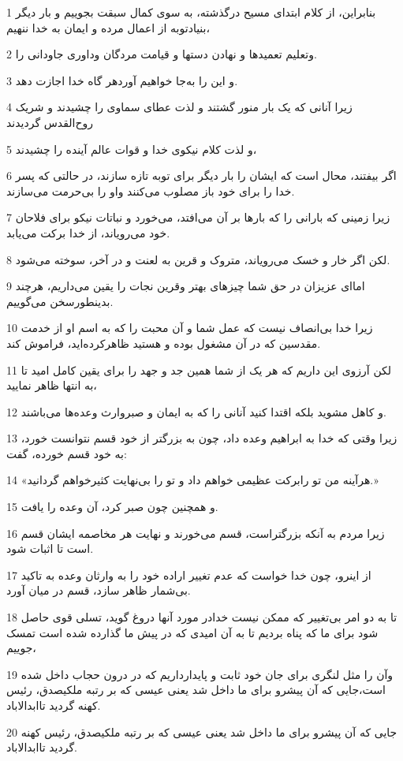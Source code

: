 \par 1 بنابراین، از کلام ابتدای مسیح درگذشته، به سوی کمال سبقت بجوییم و بار دیگر بنیادتوبه از اعمال مرده و ایمان به خدا ننهیم،
\par 2 وتعلیم تعمیدها و نهادن دستها و قیامت مردگان وداوری جاودانی را.
\par 3 و این را به‌جا خواهیم آوردهر گاه خدا اجازت دهد.
\par 4 زیرا آنانی که یک بار منور گشتند و لذت عطای سماوی را چشیدند و شریک روح‌القدس گردیدند
\par 5 و لذت کلام نیکوی خدا و قوات عالم آینده را چشیدند،
\par 6 اگر بیفتند، محال است که ایشان را بار دیگر برای توبه تازه سازند، در حالتی که پسر خدا را برای خود باز مصلوب می‌کنند واو را بی‌حرمت می‌سازند.
\par 7 زیرا زمینی که بارانی را که بارها بر آن می‌افتد، می‌خورد و نباتات نیکو برای فلاحان خود می‌رویاند، از خدا برکت می‌یابد.
\par 8 لکن اگر خار و خسک می‌رویاند، متروک و قرین به لعنت و در آخر، سوخته می‌شود.
\par 9 اما‌ای عزیزان در حق شما چیزهای بهتر وقرین نجات را یقین می‌داریم، هر‌چند بدینطورسخن می‌گوییم.
\par 10 زیرا خدا بی‌انصاف نیست که عمل شما و آن محبت را که به اسم او از خدمت مقدسین که در آن مشغول بوده و هستید ظاهرکرده‌اید، فراموش کند.
\par 11 لکن آرزوی این داریم که هر یک از شما همین جد و جهد را برای یقین کامل امید تا به انتها ظاهر نمایید،
\par 12 و کاهل مشوید بلکه اقتدا کنید آنانی را که به ایمان و صبروارث وعده‌ها می‌باشند.
\par 13 زیرا وقتی که خدا به ابراهیم وعده داد، چون به بزرگتر از خود قسم نتوانست خورد، به خود قسم خورده، گفت:
\par 14 «هرآینه من تو رابرکت عظیمی خواهم داد و تو را بی‌نهایت کثیرخواهم گردانید.»
\par 15 و همچنین چون صبر کرد، آن وعده را یافت.
\par 16 زیرا مردم به آنکه بزرگتراست، قسم می‌خورند و نهایت هر مخاصمه ایشان قسم است تا اثبات شود.
\par 17 از اینرو، چون خدا خواست که عدم تغییر اراده خود را به وارثان وعده به تاکید بی‌شمار ظاهر سازد، قسم در میان آورد.
\par 18 تا به دو امر بی‌تغییر که ممکن نیست خدادر مورد آنها دروغ گوید، تسلی قوی حاصل شود برای ما که پناه بردیم تا به آن امیدی که در پیش ما گذارده شده است تمسک جوییم،
\par 19 وآن را مثل لنگری برای جان خود ثابت و پایدارداریم که در درون حجاب داخل شده است،جایی که آن پیشرو برای ما داخل شد یعنی عیسی که بر رتبه ملکیصدق، رئیس کهنه گردید تاابدالاباد.
\par 20 جایی که آن پیشرو برای ما داخل شد یعنی عیسی که بر رتبه ملکیصدق، رئیس کهنه گردید تاابدالاباد.

